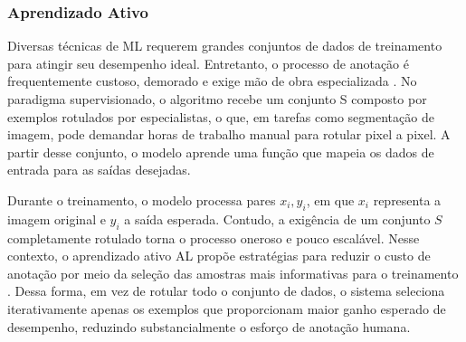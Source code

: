 

\subsubsection{Aprendizado Ativo}

Diversas técnicas de \ac{ML} requerem grandes conjuntos de dados de treinamento para atingir seu desempenho ideal. Entretanto, o processo de anotação é frequentemente custoso, demorado e exige mão de obra especializada \cite{konyushkova2017learning}. 
No paradigma supervisionado, o algoritmo recebe um conjunto S composto por exemplos rotulados por especialistas, o que, em tarefas como segmentação de imagem, pode demandar horas de trabalho manual para rotular pixel a pixel. A partir desse conjunto, o modelo aprende uma função que mapeia os dados de entrada para as saídas desejadas.


Durante o treinamento, o modelo processa pares $x_i,y_i$, em que $x_i$ representa a imagem original e $y_i$ a saída esperada.
Contudo, a exigência de um conjunto $S$ completamente rotulado torna o processo oneroso e pouco escalável. Nesse contexto, o aprendizado ativo \ac{AL} propõe estratégias para reduzir o custo de anotação por meio da seleção das amostras mais informativas para o treinamento \cite{settles2009active}. Dessa forma, em vez de rotular todo o conjunto de dados, o sistema seleciona iterativamente apenas os exemplos que proporcionam maior ganho esperado de desempenho, reduzindo substancialmente o esforço de anotação humana.


